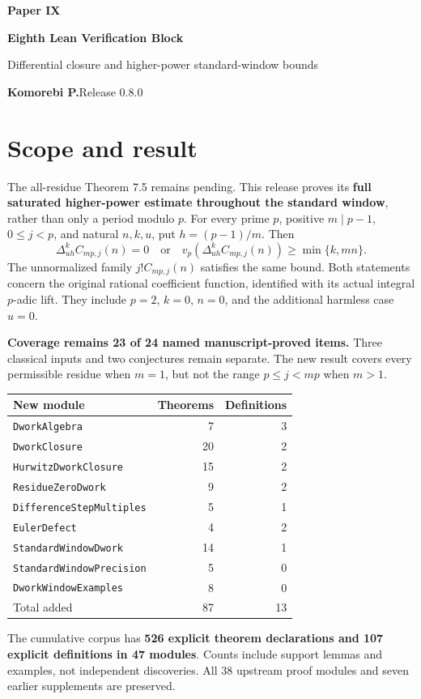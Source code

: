 \documentclass[11pt]{article}
\begin{document}
{\LARGE\bfseries\color{ink}Paper IX}\par
{\Large\bfseries Eighth Lean Verification Block}\par
{\large Differential closure and higher-power standard-window bounds}\par
\textbf{Komorebi P.}\hfill Release 0.8.0
\bigskip
\section*{Scope and result}
The all-residue Theorem 7.5 remains pending. This release proves its \textbf{full saturated higher-power estimate throughout the standard window}, rather than only a period modulo $p$. For every prime $p$, positive $m\mid p-1$, $0\le j<p$, and natural $n,k,u$, put $h=(p-1)/m$. Then
\[
\boxed{\quad
\Delta_{uh}^{k}C_{mp,j}(n)=0\quad\text{or}\quad
v_p\!\left(\Delta_{uh}^{k}C_{mp,j}(n)\right)\ge\min\{k,mn\}.
\quad}
\]
The unnormalized family $j!C_{mp,j}(n)$ satisfies the same bound. Both statements concern the original rational coefficient function, identified with its actual integral $p$-adic lift. They include $p=2$, $k=0$, $n=0$, and the additional harmless case $u=0$.

\textbf{Coverage remains 23 of 24 named manuscript-proved items.} Three classical inputs and two conjectures remain separate. The new result covers every permissible residue when $m=1$, but not the range $p\le j<mp$ when $m>1$.

\begin{center}\begin{tabular}{@{}p{}rr@{}}\toprule
New module & Theorems & Definitions\\\midrule
\texttt{DworkAlgebra} & 7 & 3\\
\texttt{DworkClosure} & 20 & 2\\
\texttt{HurwitzDworkClosure} & 15 & 2\\
\texttt{ResidueZeroDwork} & 9 & 2\\
\texttt{DifferenceStepMultiples} & 5 & 1\\
\texttt{EulerDefect} & 4 & 2\\
\texttt{StandardWindowDwork} & 14 & 1\\
\texttt{StandardWindowPrecision} & 5 & 0\\
\texttt{DworkWindowExamples} & 8 & 0\\\midrule
Total added & 87 & 13\\\bottomrule
\end{tabular}\end{center}
The cumulative corpus has \textbf{526 explicit theorem declarations and 107 explicit definitions in 47 modules}. Counts include support lemmas and examples, not independent discoveries. All 38 upstream proof modules and seven earlier supplements are preserved.
\end{document}
